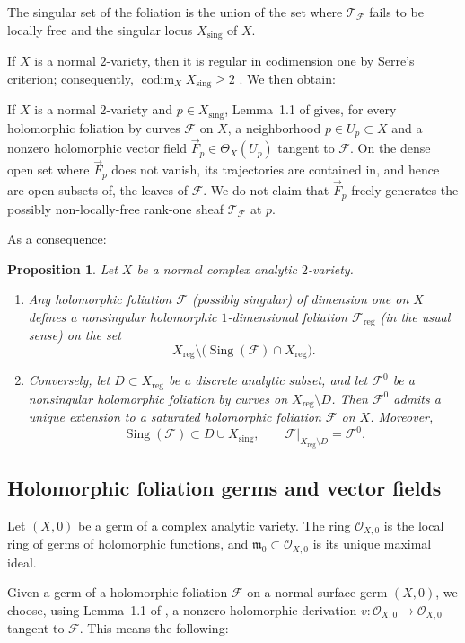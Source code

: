 \documentclass[11pt,twoside]{amsart}
\newcommand{\OO}{\mathcal O}
\newcommand{\F}{\mathcal F}
\newcommand{\T}{\mathcal T}
\DeclareMathOperator{\Sing}{Sing}
\DeclareMathOperator{\codim}{codim}
\DeclareMathOperator{\sing}{sing}
\newtheorem{propo}{Proposition}
\theoremstyle{definition}
\begin{document}
The singular set of the foliation is the union of the set where $\T_\F$ fails to be locally free and the singular locus $X_{\sing}$ of $X$.

If $X$ is a normal $2$-variety, then it is regular in codimension one by Serre's criterion; consequently, $\codim_X X_{\sing}\geq 2$ \cite{Matsumura,Serre}. We then obtain:

If $X$ is a normal $2$-variety and $p\in X_{\sing}$, Lemma~1.1 of
\cite{Camacho1988} gives, for every holomorphic foliation by curves $\F$ on
$X$, a neighborhood $p\in U_p\subset X$ and a nonzero holomorphic vector
field $\vec F_p\in\Theta_X(U_p)$ tangent to $\F$. On the dense open set where
$\vec F_p$ does not vanish, its trajectories are contained in, and hence are
open subsets of, the leaves of $\F$. We do not claim that $\vec F_p$ freely
generates the possibly non-locally-free rank-one sheaf $\T_\F$ at $p$.

As a consequence:

\begin{propo}\normalfont
Let $X$ be a normal complex analytic $2$-variety.
\begin{enumerate}
\item[(i)] Any holomorphic foliation $\F$ (possibly singular) of dimension one on $X$ defines a nonsingular holomorphic $1$-dimensional foliation $\F_\mathrm{reg}$ (in the usual sense) on the set
\[
X_{\mathrm{reg}}\setminus \bigl(\Sing(\F)\cap X_{\mathrm{reg}}\bigr).
\]

\item[(ii)] Conversely, let $D\subset X_{\mathrm{reg}}$ be a discrete analytic subset, and let $\F^0$ be a nonsingular holomorphic foliation by curves on $X_{\mathrm{reg}}\setminus D$. Then $\F^0$ admits a unique extension to a saturated holomorphic foliation $\F$ on $X$. Moreover,
\[
\Sing(\F)\subset D\cup X_{\sing},
\qquad
\F|_{X_{\mathrm{reg}}\setminus D}=\F^0.
\]
\end{enumerate}
\end{propo}


\subsection{Holomorphic foliation germs and vector fields}

Let $(X,0)$ be a germ of a complex analytic variety. The ring $\OO_{X,0}$ is the local ring of germs of holomorphic functions, and $\mathfrak{m}_0\subset\OO_{X,0}$ is its unique maximal ideal.

Given a germ of a holomorphic foliation $\F$ on a normal surface germ
$(X,0)$, we choose, using Lemma~1.1 of \cite{Camacho1988}, a nonzero
holomorphic derivation $v\colon\OO_{X,0}\to\OO_{X,0}$ tangent to $\F$.
This means the following:
\end{document}

